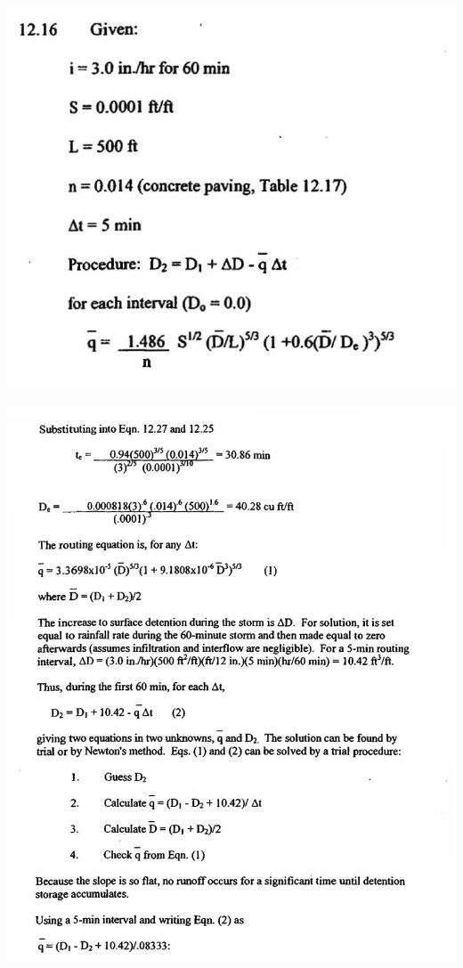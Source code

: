 \documentclass[11pt]{article}
\begin{document}
\begin{enumerate}
\includegraphics{12-16a.pdf}

\includegraphics{12-16b.pdf}


\end{enumerate}
\end{document}
